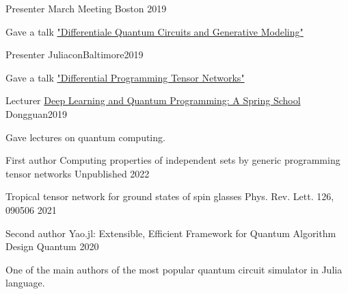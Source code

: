 \documentclass[11pt, a4paper]{awesome-cv}
\begin{document}
%
\begin{cventries}
\cventry
    {Presenter} %
    {March Meeting} %
    {Boston} %
    {2019} %
    {
    \begin{cvitems}
        Gave a talk \href{https://meetings.aps.org/Meeting/MAR19/Session/E27.10}{"Differentiale Quantum Circuits and Generative Modeling"}
    \end{cvitems}
    }
\cventry
    {Presenter}
    {Juliacon}{Baltimore}{2019}
    {
    \begin{cvitems}
        Gave a talk \href{https://www.youtube.com/watch?v=f-CaQMTqjPk}{"Differential Programming Tensor Networks"}
    \end{cvitems}
    }
\cventry
    {Lecturer}
    {\href{https://github.com/QuantumBFS/SSSS}{Deep Learning and Quantum Programming: A Spring School}}
    {Dongguan}{2019}
    {
    \begin{cvitems}
        Gave lectures on quantum computing.
    \end{cvitems}
    }

\end{cventries}

%
%
\begin{cventries}
  \cventry
    {First author} %
    {Computing properties of independent sets by generic programming tensor networks} %
    {Unpublished} %
    {2022} %
    {
      \begin{cvitems} %
        \item {}
      \end{cvitems}
    }
  {Tropical tensor network for ground states of spin glasses}
  {Phys. Rev. Lett. 126, 090506}
  {2021}
  {
      \begin{cvitems} %
        \item {}
      \end{cvitems}
  }
  \cventry
    {Second author} %
    {Yao.jl: Extensible, Efficient Framework for Quantum Algorithm Design} %
    {Quantum} %
    {2020} %
    {
      \begin{cvitems} %
        \item {One of the main authors of the most popular quantum circuit simulator in Julia language.}
      \end{cvitems}
    }
\end{cventries}
\end{document}
